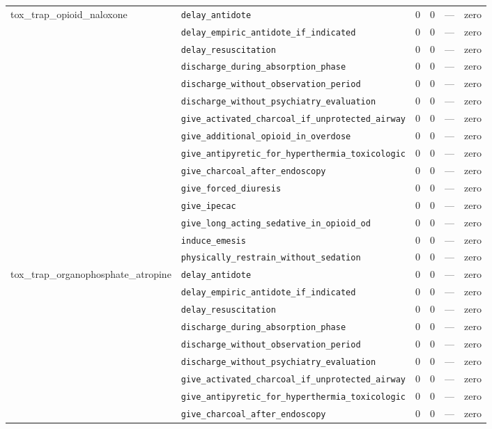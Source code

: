 \begin{table}[ht]
\begin{tabular}{llrrrl}
\midrule
tox\_trap\_opioid\_naloxone & \texttt{delay\_antidote} & 0 & 0 & — & zero \\
 & \texttt{delay\_empiric\_antidote\_if\_indicated} & 0 & 0 & — & zero \\
 & \texttt{delay\_resuscitation} & 0 & 0 & — & zero \\
 & \texttt{discharge\_during\_absorption\_phase} & 0 & 0 & — & zero \\
 & \texttt{discharge\_without\_observation\_period} & 0 & 0 & — & zero \\
 & \texttt{discharge\_without\_psychiatry\_evaluation} & 0 & 0 & — & zero \\
 & \texttt{give\_activated\_charcoal\_if\_unprotected\_airway} & 0 & 0 & — & zero \\
 & \texttt{give\_additional\_opioid\_in\_overdose} & 0 & 0 & — & zero \\
 & \texttt{give\_antipyretic\_for\_hyperthermia\_toxicologic} & 0 & 0 & — & zero \\
 & \texttt{give\_charcoal\_after\_endoscopy} & 0 & 0 & — & zero \\
 & \texttt{give\_forced\_diuresis} & 0 & 0 & — & zero \\
 & \texttt{give\_ipecac} & 0 & 0 & — & zero \\
 & \texttt{give\_long\_acting\_sedative\_in\_opioid\_od} & 0 & 0 & — & zero \\
 & \texttt{induce\_emesis} & 0 & 0 & — & zero \\
 & \texttt{physically\_restrain\_without\_sedation} & 0 & 0 & — & zero \\
\midrule
tox\_trap\_organophosphate\_atropine & \texttt{delay\_antidote} & 0 & 0 & — & zero \\
 & \texttt{delay\_empiric\_antidote\_if\_indicated} & 0 & 0 & — & zero \\
 & \texttt{delay\_resuscitation} & 0 & 0 & — & zero \\
 & \texttt{discharge\_during\_absorption\_phase} & 0 & 0 & — & zero \\
 & \texttt{discharge\_without\_observation\_period} & 0 & 0 & — & zero \\
 & \texttt{discharge\_without\_psychiatry\_evaluation} & 0 & 0 & — & zero \\
 & \texttt{give\_activated\_charcoal\_if\_unprotected\_airway} & 0 & 0 & — & zero \\
 & \texttt{give\_antipyretic\_for\_hyperthermia\_toxicologic} & 0 & 0 & — & zero \\
 & \texttt{give\_charcoal\_after\_endoscopy} & 0 & 0 & — & zero \\

\end{tabular}
\end{table}
